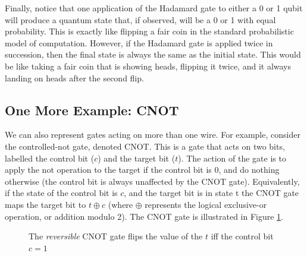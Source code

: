 \documentclass[11pt, oneside]{article}   	%
\begin{document}
\bigskip
\noindent
Finally, notice that one application of the Hadamard gate to either a 0 or 1 qubit will produce a quantum state that, if observed, will be a 0 or 1 with equal probability. This is exactly like flipping a fair coin in the standard probabilistic model of computation. However, if the Hadamard gate is applied twice in succession, then the final state is always the same as the initial state. This would be like taking a fair coin that is showing heads, flipping it twice, and it always landing on heads after the second flip.

\bigskip
\subsection{One More Example: CNOT}
We can also represent gates acting on more than one wire. For example, consider the controlled-not gate, denoted CNOT. This is a gate that acts on two bits, labelled the control bit ($c$) and the target bit ($t$). The action of the 
gate is to apply the not operation to the target if the control bit is 0, and do nothing otherwise (the control bit is always unaffected by the CNOT gate). Equivalently, if the state of the control bit is $c$, and the target bit is in state t the CNOT gate maps the target bit to $t \oplus c$ (where $\oplus$  represents the logical exclusive-or operation, or addition modulo 2). The CNOT gate is illustrated in Figure  \ref{fig:cnot}.



\begin{figure}[H]
\caption{The \emph{reversible} CNOT gate flips the value of the $t$ iff the control bit $c = 1$ }
\label{fig:cnot}
\end{figure}
\end{document}
